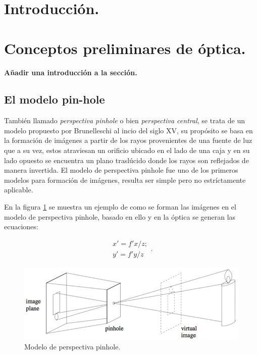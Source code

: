 
\section{Introducción.}


\section{Conceptos preliminares de óptica.}
    
    {\bfseries\Large Añadir una introducción a la sección.}
    
\subsection{El modelo pin-hole\label{sec:pin-hole}}
    También llamado \emph{perspectiva pinhole} o bien \emph{perspectiva central}, se trata de un modelo propuesto por Brunelleschi al incio del siglo XV, su propósito se basa en la formación de imágenes a partir de los rayos provenientes de una fuente de luz que a su vez, estos atraviesan un orificio ubicado en el lado de una caja y en su lado opuesto se encuentra un plano traslúcido donde los rayos son reflejados de manera invertida. El modelo de perspectiva pinhole fue uno de los primeros modelos para formación de imágenes, resulta ser simple pero no estríctamente aplicable. \citet{Forsyth2003}
    
    En la figura \ref{perspectivaPinhole} se muestra un ejemplo de como se forman las imágenes en el modelo de perspectiva pinhole, basado en ello y en la óptica se generan las ecuaciones:
    
    \begin{equation}
         \begin{array}{ll}
         x'= f' x/z ;\\
         y'= f' y/z \end{array}.
    \end{equation}
   
    

    \begin{figure}[ht]
        \centering
        \includegraphics[scale=1.25]{GraficosEdArt/fig1.png} 
        \caption{Modelo de perspectiva pinhole. \citet{Forsyth2003}}
        \label{perspectivaPinhole}
    \end{figure}
    

